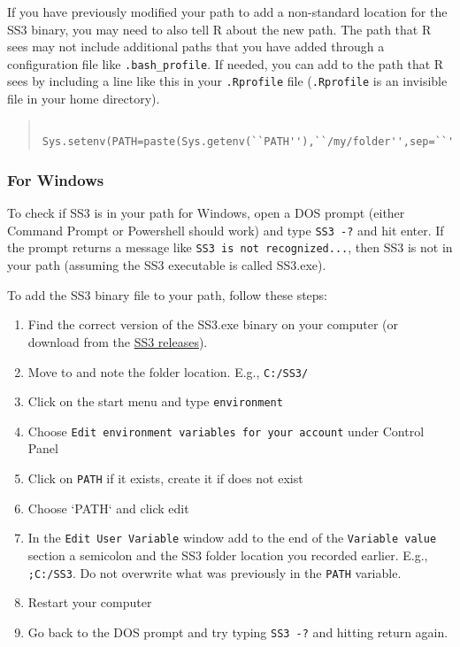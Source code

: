 If you have previously modified your path to add a non-standard location for the SS3 binary, you may need to also tell R about the new path. The path that R sees may not include additional paths that you have added through a configuration file like \texttt{.bash\_profile}. If needed, you can add to the path that R sees by including a line like this in your \texttt{.Rprofile} file (\texttt{.Rprofile} is an invisible file in your home directory).

\begin{quote}
   \begin{verbatim}
    Sys.setenv(PATH=paste(Sys.getenv(``PATH''),``/my/folder'',sep=``'':''))
    \end{verbatim}
\end{quote}

\subsubsection{For Windows}

To check if SS3 is in your path for Windows, open a DOS prompt (either Command Prompt or Powershell should work) and type \texttt{SS3 -?} and hit enter. If the prompt returns a message like \texttt{SS3 is not recognized...}, then SS3 is not in your path (assuming the SS3 executable is called SS3.exe).

To add the SS3 binary file to your path, follow these steps:

\begin{enumerate}
  \item Find the correct version of the SS3.exe binary on your computer (or download from the \href{https://github.com/nmfs-ost/ss3-source-code/releases}{SS3 releases}).
  \item Move to and note the folder location. E.g., \texttt{C:/SS3/}
  \item Click on the start menu and type \texttt{environment}
  \item Choose \texttt{Edit environment variables for your account} under Control Panel
  \item Click on \texttt{PATH} if it exists, create it if does not exist 
  \item Choose `PATH` and click edit
  \item In the \texttt{Edit User Variable} window add to the end of the \texttt{Variable value} section a semicolon and the SS3 folder location you recorded earlier.
     E.g., \texttt{;C:/SS3}. Do not overwrite what was previously in the \texttt{PATH} variable.
  \item Restart your computer
  \item Go back to the DOS prompt and try typing \texttt{SS3 -?} and hitting return again.
\end{enumerate}


